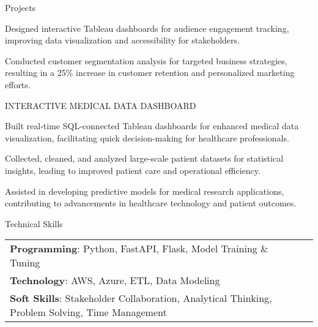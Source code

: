 \documentclass{resume} %
\begin{document}
\begin{rSection}{Projects}
\begin{rSubsection}
                                    \item Designed interactive Tableau dashboards for audience engagement tracking, improving data visualization and accessibility for stakeholders.
                                    \item Conducted customer segmentation analysis for targeted business strategies, resulting in a 25\% increase in customer retention and personalized marketing efforts.
                            \end{rSubsection}
                    \begin{rSubsection}
                                    {INTERACTIVE MEDICAL DATA DASHBOARD}
                                {}{}{}
                                    \item Built real{-}time SQL{-}connected Tableau dashboards for enhanced medical data visualization, facilitating quick decision{-}making for healthcare professionals.
                                    \item Collected, cleaned, and analyzed large{-}scale patient datasets for statistical insights, leading to improved patient care and operational efficiency.
                                    \item Assisted in developing predictive models for medical research applications, contributing to advancements in healthcare technology and patient outcomes.
                            \end{rSubsection}
            \end{rSection}

    \begin{rSection}{Technical Skills}
        \begin{tabular}{ @{} l @{	} l }
                                \textbf{Programming}: Python, FastAPI, Flask, Model Training \& Tuning\\
                                \textbf{Technology}: AWS, Azure, ETL, Data Modeling\\
                                \textbf{Soft Skills}: Stakeholder Collaboration, Analytical Thinking, Problem Solving, Time Management\\
        \end{tabular}
    \end{rSection}
\end{document}
